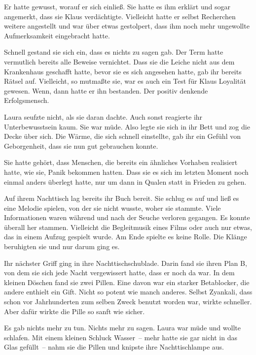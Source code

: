 \par

Er hatte gewusst, worauf er sich einließ. Sie hatte es ihm erklärt und sogar angemerkt, dass sie Klaus verdächtigte. Vielleicht hatte er selbst Recherchen weitere angestellt und war über etwas gestolpert, dass ihm noch mehr ungewollte Aufmerksamkeit eingebracht hatte.

\par

Schnell gestand sie sich ein, dass es nichts zu sagen gab. Der Term hatte vermutlich bereits alle Beweise vernichtet. Dass sie die Leiche nicht aus dem Krankenhaus geschafft hatte, bevor sie es sich angesehen hatte, gab ihr bereits Rätsel auf. Vielleicht, so mutmaßte sie, war es auch ein Test für Klaus Loyalität gewesen. Wenn, dann hatte er ihn bestanden. Der positiv denkende Erfolgsmensch.

\par

Laura seufzte nicht, als sie daran dachte. Auch sonst reagierte ihr Unterbewusstsein kaum. Sie war müde. Also legte sie sich in ihr Bett und zog die Decke über sich. Die Wärme, die sich schnell einstellte, gab ihr ein Gefühl von Geborgenheit, dass sie nun gut gebrauchen konnte.

\par

Sie hatte gehört, dass Menschen, die bereits ein ähnliches Vorhaben realisiert hatte, wie sie, Panik bekommen hatten. Dass sie es sich im letzten Moment noch einmal anders überlegt hatte, nur um dann in Qualen statt in Frieden zu gehen.

\par

Auf ihrem Nachttisch lag bereits ihr Buch bereit. Sie schlug es auf und ließ es eine Melodie spielen, von der sie nicht wusste, woher sie stammte. Viele Informationen waren während und nach der Seuche verloren gegangen. Es konnte überall her stammen. Vielleicht die Begleitmusik eines Films oder auch nur etwas, das in einem Aufzug gespielt wurde. Am Ende spielte es keine Rolle. Die Klänge beruhigten sie und nur darum ging es.

\par

Ihr nächster Griff ging in ihre Nachttischschublade. Darin fand sie ihren Plan B, von dem sie sich jede Nacht vergewissert hatte, dass er noch da war. In dem kleinen Döschen fand sie zwei Pillen. Eine davon war ein starker Betablocker, die andere enthielt ein Gift. Nicht so potent wie manch anderes. Selbst Zyankali, dass schon vor Jahrhunderten zum selben Zweck benutzt worden war, wirkte schneller. Aber dafür wirkte die Pille so sanft wie sicher.

\par

Es gab nichts mehr zu tun. Nichts mehr zu sagen. Laura war müde und wollte schlafen. Mit einem kleinen Schluck Wasser~-- mehr hatte sie gar nicht in das Glas gefüllt~-- nahm sie die Pillen und knipste ihre Nachttischlampe aus.
